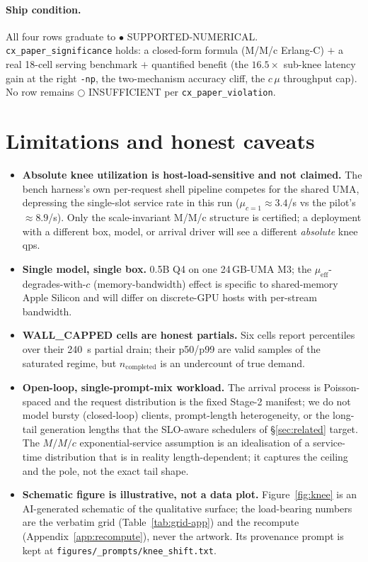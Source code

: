 \documentclass[11pt,a4paper]{article}
\begin{document}
\paragraph{Ship condition.} All four rows graduate to \(\bullet\)
SUPPORTED-NUMERICAL. \texttt{cx\_paper\_significance} holds: a closed-form
formula (M/M/c Erlang-C) \(+\) a real 18-cell serving benchmark \(+\) quantified
benefit (the \(16.5\times\) sub-knee latency gain at the right \texttt{-np}, the
two-mechanism accuracy cliff, the \(c\,\mu\) throughput cap). No row remains
\(\bigcirc\) INSUFFICIENT per \texttt{cx\_paper\_violation}.

\section{Limitations and honest caveats}
\label{sec:limits}
\begin{itemize}
  \item \textbf{Absolute knee utilization is host-load-sensitive and not
    claimed.} The bench harness's own per-request shell pipeline competes for
    the shared UMA, depressing the single-slot service rate in this run
    (\(\mu_{c=1}\approx 3.4\)/s vs the pilot's \(\approx 8.9\)/s). Only the
    scale-invariant M/M/c structure is certified; a deployment with a different
    box, model, or arrival driver will see a different \emph{absolute} knee qps.
  \item \textbf{Single model, single box.} 0.5B Q4 on one 24\,GB-UMA M3; the
    \(\mu_{\mathrm{eff}}\)-degrades-with-\(c\) (memory-bandwidth) effect is
    specific to shared-memory Apple Silicon and will differ on discrete-GPU
    hosts with per-stream bandwidth.
  \item \textbf{WALL\_CAPPED cells are honest partials.} Six cells report
    percentiles over their \SI{240}{\second} partial drain; their p50/p99 are
    valid samples of the saturated regime, but \(n_{\text{completed}}\) is an
    undercount of true demand.
  \item \textbf{Open-loop, single-prompt-mix workload.} The arrival process is
    Poisson-spaced and the request distribution is the fixed Stage-2 manifest;
    we do not model bursty (closed-loop) clients, prompt-length heterogeneity,
    or the long-tail generation lengths that the SLO-aware schedulers of
    \S\ref{sec:related} target. The \(M/M/c\) exponential-service assumption is
    an idealisation of a service-time distribution that is in reality
    length-dependent; it captures the ceiling and the pole, not the exact tail
    shape.
  \item \textbf{Schematic figure is illustrative, not a data plot.}
    Figure~\ref{fig:knee} is an AI-generated schematic of the qualitative
    surface; the load-bearing numbers are the verbatim grid
    (Table~\ref{tab:grid-app}) and the recompute (Appendix~\ref{app:recompute}),
    never the artwork. Its provenance prompt is kept at
    \texttt{figures/\_prompts/knee\_shift.txt}.
\end{itemize}
\end{document}
